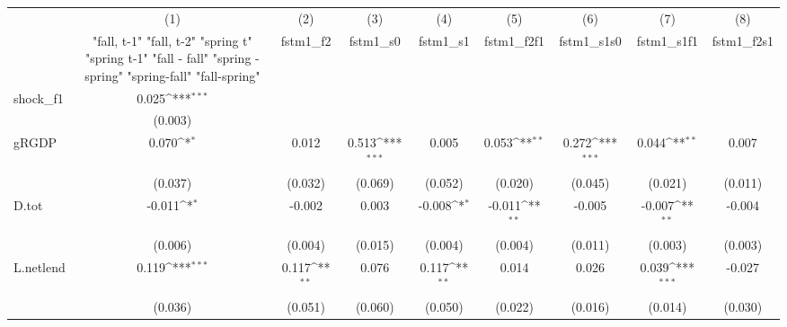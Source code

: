 {
\def\sym#1{\ifmmode^{#1}\else\(^{#1}\)\fi}
\begin{tabular}{l*{8}{c}}
\toprule
            &\multicolumn{1}{c}{(1)}&\multicolumn{1}{c}{(2)}&\multicolumn{1}{c}{(3)}&\multicolumn{1}{c}{(4)}&\multicolumn{1}{c}{(5)}&\multicolumn{1}{c}{(6)}&\multicolumn{1}{c}{(7)}&\multicolumn{1}{c}{(8)}\\
            &\multicolumn{1}{c}{  "fall, t-1" "fall, t-2" "spring t" "spring t-1"  "fall - fall" "spring - spring" "spring-fall" "fall-spring" }&\multicolumn{1}{c}{fstm1\_f2}&\multicolumn{1}{c}{fstm1\_s0}&\multicolumn{1}{c}{fstm1\_s1}&\multicolumn{1}{c}{fstm1\_f2f1}&\multicolumn{1}{c}{fstm1\_s1s0}&\multicolumn{1}{c}{fstm1\_s1f1}&\multicolumn{1}{c}{fstm1\_f2s1}\\
\midrule
shock\_f1    &       0.025\sym{***}&                     &                     &                     &                     &                     &                     &                     \\
            &     (0.003)         &                     &                     &                     &                     &                     &                     &                     \\
\addlinespace
gRGDP       &       0.070\sym{*}  &       0.012         &       0.513\sym{***}&       0.005         &       0.053\sym{**} &       0.272\sym{***}&       0.044\sym{**} &       0.007         \\
            &     (0.037)         &     (0.032)         &     (0.069)         &     (0.052)         &     (0.020)         &     (0.045)         &     (0.021)         &     (0.011)         \\
\addlinespace
D.tot       &      -0.011\sym{*}  &      -0.002         &       0.003         &      -0.008\sym{*}  &      -0.011\sym{**} &      -0.005         &      -0.007\sym{**} &      -0.004         \\
            &     (0.006)         &     (0.004)         &     (0.015)         &     (0.004)         &     (0.004)         &     (0.011)         &     (0.003)         &     (0.003)         \\
\addlinespace
L.netlend   &       0.119\sym{***}&       0.117\sym{**} &       0.076         &       0.117\sym{**} &       0.014         &       0.026         &       0.039\sym{***}&      -0.027         \\
            &     (0.036)         &     (0.051)         &     (0.060)         &     (0.050)         &     (0.022)         &     (0.016)         &     (0.014)         &     (0.030)         \\

\end{tabular}}
